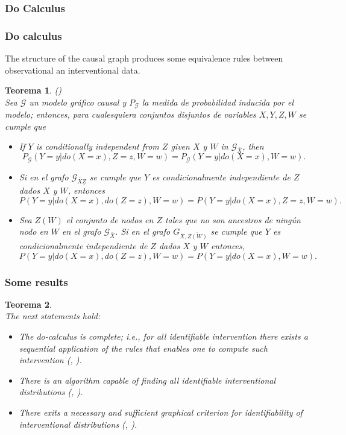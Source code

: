 \documentclass{beamer}
\theoremstyle{plain}
\newtheorem{teo}{Teorema}
\begin{document}
		\subsubsection{Do Calculus}
		\begin{frame}[allowframebreaks]
		\frametitle{Do calculus}
		The structure of the causal graph produces some equivalence rules between observational an interventional data.
		\begin{teo}{\label{docalculus}} (\cite{pearl2009causality})\\
		Sea $\mathcal{G}$ un modelo gráfico causal y $P_{\mathcal{G}}$ la medida de probabilidad inducida por el modelo; entonces, para cualesquiera conjuntos disjuntos de variables $X,Y,Z,W$ 	se cumple que
		\begin{itemize}
		\item If $Y$ is conditionally independent from $Z$ given $X$ y $W$ in $\mathcal{G}_{\bar{X}}$, then
		\[ P_{\mathcal{G}}(Y=y | do(X=x), Z=z, W=w) = P_{\mathcal{G}}(Y=y | do(X=x), W=w). \]
		\item Si en el grafo $\mathcal{G}_{\bar{X}\underline{Z}}$ se cumple que $Y$ es condicionalmente independiente de $Z$ dados $X$ y $W$, entonces
		\[ P(Y=y | do(X=x), do(Z=z), W=w) = P(Y=y | do(X=x), Z = z, W=w). \]
		\item Sea $Z(W)$ el conjunto de nodos en $Z$ tales que no son ancestros de ningún nodo en $W$ en el grafo $\mathcal{G}_{\bar{X}}$. Si en el grafo $G_{\bar{X}, \bar{Z(W)}}$ se cumple que $Y$ es condicionalmente independiente de $Z$ dados $X$ y $W$ entonces,
		\[ P(Y=y | do(X=x), do(Z=z), W=w) = P(Y=y | do(X=x), W=w). \]
		\end{itemize}
		\end{teo}
		\end{frame}
		\begin{frame}
		\frametitle{Some results}
		\begin{teo}{\cite{peters2017elements}}\\
 		The next statements hold:
		\begin{itemize}
		\item The do-calculus is complete; i.e., for all identifiable intervention there exists a sequential application of the rules that enables one to compute such intervention (\cite{huang2006pearl}, 				\cite{shpitser2006identification}).
		\item There is an algorithm capable of finding all identifiable interventional distributions (\cite{tian2002}, \cite{huang2006pearl}).
		\item There exits a necessary and sufficient graphical criterion for identifiability of interventional distributions (\cite{shpitser2006identification}, \cite{huang2006pearl}).
		\end{itemize}
		\end{teo}
		\end{frame}
\end{document}
